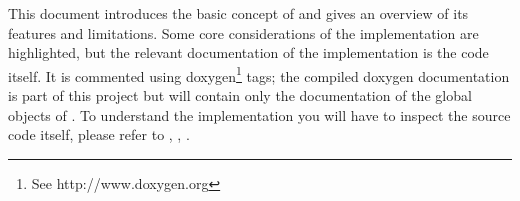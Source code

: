This document introduces the basic concept of \rtos{} and gives an
overview of its features and limitations. Some core considerations of the
implementation are highlighted, but the relevant documentation of the
implementation is the code itself. It is commented using
doxygen\footnote{See http://www.doxygen.org} tags; the compiled doxygen
documentation is part of this project but will contain only the
documentation of the global objects of \rtos. To understand the
implementation you will have to inspect the source code itself, please
refer to , , .


